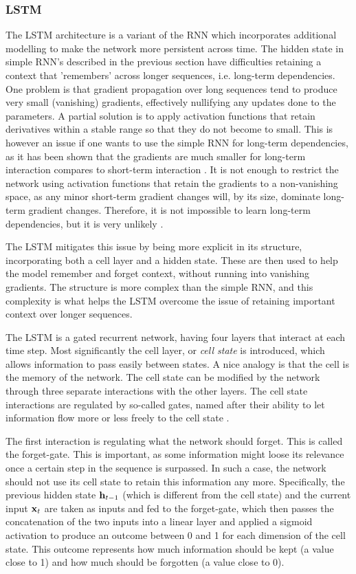 \documentclass[a4paper,12pt]{article}
\begin{document}
\subsubsection{LSTM}
The LSTM architecture is a variant of the RNN which incorporates additional modelling to make the network more persistent across time. The hidden state in simple RNN's described in the previous section have difficulties retaining a context that 'remembers' across longer sequences, i.e. long-term dependencies. One problem is that gradient propagation over long sequences tend to produce very small (vanishing) gradients, effectively nullifying any updates done to the parameters. A partial solution is to apply activation functions that retain derivatives within a stable range so that they do not become to small. This is however an issue if one wants to use the simple RNN for long-term dependencies, as it has been shown that the gradients are much smaller for long-term interaction compares to short-term interaction \cite{Goodfellow-et-al-2016}. It is not enough to restrict the network using activation functions that retain the gradients to a non-vanishing space, as any minor short-term gradient changes will, by its size, dominate long-term gradient changes. Therefore, it is not impossible to learn long-term dependencies, but it is very unlikely \cite{Goodfellow-et-al-2016}.

The LSTM mitigates this issue by being more explicit in its structure, incorporating both a cell layer and a hidden state. These are then used to help the model remember and forget context, without running into vanishing gradients. The structure is more complex than the simple RNN, and this complexity is what helps the LSTM overcome the issue of retaining important context over longer sequences.


The LSTM is a gated recurrent network, having four layers that interact at each time step. Most significantly the cell layer, or \textit{cell state} is introduced, which allows information to pass easily between states. A nice analogy is that the cell is the memory of the network. The cell state can be modified by the network through three separate interactions with the other layers. The cell state interactions are regulated by so-called gates, named after their ability to let information flow more or less freely to the cell state \cite{lstmwebsite}.

The first interaction is regulating what the network should forget. This is called the forget-gate. This is important, as some information might loose its relevance once a certain step in the sequence is surpassed. In such a case, the network should not use its cell state to retain this information any more. Specifically, the previous hidden state $\mathbf{ h }_{t-1}$ (which is different from the cell state) and the current input $\mathbf{ x }_t$ are taken as inputs and fed to the forget-gate, which then passes the concatenation of the two inputs into a linear layer and applied a sigmoid activation to produce an outcome between 0 and 1 for each dimension of the cell state. This outcome represents how much information should be kept (a value close to 1) and how much should be forgotten (a value close to 0).
\end{document}
